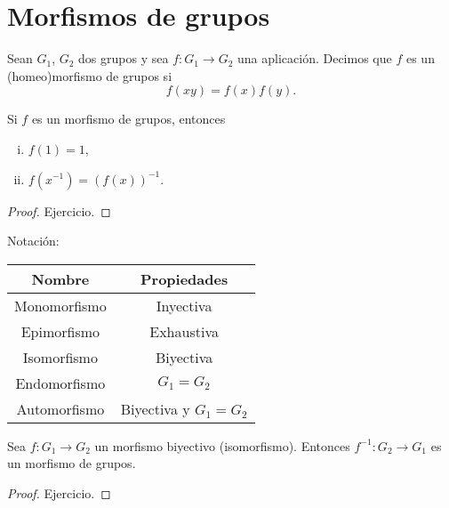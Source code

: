 \section{Morfismos de grupos}

\begin{defi}[homeomorfismo]
    Sean $G_1$, $G_2$ dos grupos y sea $f \colon G_1 \to G_2$ una aplicación. Decimos que $f$ es un
    (homeo)morfismo de grupos si
    \[
        f(xy) = f(x)f(y).
    \]
\end{defi}

\begin{prop}
    Si $f$ es un morfismo de grupos, entonces
    \begin{enumerate}[i)]
        \item $f(1) = 1$,
        \item $f\left( x^{-1} \right) = \left( f(x) \right)^{-1}$.
    \end{enumerate}
\end{prop}

\begin{proof}
    Ejercicio.
\end{proof}

\begin{obs}
    Notación:
    \begin{center}
        \begin{tabular}{|c|c|}
            \hline
            Nombre & Propiedades \\
            \hline\hline
            Monomorfismo & Inyectiva \\\hline
            Epimorfismo  & Exhaustiva \\\hline
            Isomorfismo  & Biyectiva \\\hline
            Endomorfismo & $G_1 = G_2$ \\\hline
            Automorfismo & Biyectiva y $G_1 = G_2$ \\
            \hline
        \end{tabular}
    \end{center}
\end{obs}

\begin{prop}
    Sea $f \colon G_1 \to G_2$ un morfismo biyectivo (isomorfismo). Entonces
    $f^{-1} \colon G_2 \to G_1$ es un morfismo de grupos.
\end{prop}

\begin{proof}
    Ejercicio.
\end{proof}

